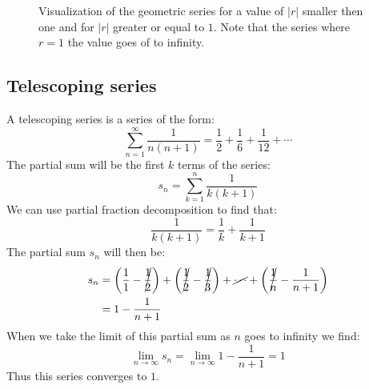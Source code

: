 \documentclass[11pt, a4paper]{article}
\begin{document}
\begin{figure}[H]
  \centering
  \qquad
  \caption{Visualization of the geometric series for a value of $|r|$ smaller then one and for $|r|$ greater or equal to $1$. Note that the series where $r=1$ the value goes of to infinity.}
\end{figure}


\subsection{Telescoping series}
A telescoping series is a series of the form:
\begin{equation*}
  \sum_{n=1}^\infty \frac{1}{n(n+1)} = \frac{1}{2} + \frac{1}{6} + \frac{1}{12} + \cdots
\end{equation*}
The partial sum will be the first $k$ terms of the series:
\begin{equation*}
  s_n = \sum_{k=1}^{n} \frac{1}{k(k+1)}
\end{equation*}
We can use partial fraction decomposition to find that:
\begin{equation*}
  \frac{1}{k(k+1)} = \frac{1}{k} + \frac{1}{k+1}
\end{equation*}
The partial sum $s_n$ will then be:
\begin{align*}
  s_n &= \left(\frac{1}{1} - \cancel{\frac{1}{2}}\right) + \left(\cancel{\frac{1}{2}} - \cancel{\frac{1}{3}}\right) + \cancel{\cdots} + \left(\cancel{\frac{1}{n}} - \frac{1}{n+1}\right)\\
      &= 1 - \frac{1}{n+1}
\end{align*}
When we take the limit of this partial sum as $n$ goes to infinity we find:
\begin{equation*}
  \lim_{n\to\infty}s_n = \lim_{n\to\infty} 1 - \frac{1}{n+1} = 1
\end{equation*}
Thus this series converges to $1$.
\end{document}
